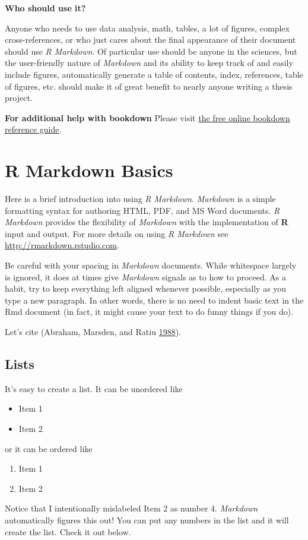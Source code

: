 \documentclass[msc,numbers]{coppe}
\providecommand{\tightlist}{%
  \setlength{\itemsep}{0pt}\setlength{\parskip}{0pt}}
\begin{document}
  \textbf{Who should use it?}
  
  Anyone who needs to use data analysis, math, tables, a lot of figures, complex cross-references, or who just cares about the final appearance of their document should use \emph{R Markdown}. Of particular use should be anyone in the sciences, but the user-friendly nature of \emph{Markdown} and its ability to keep track of and easily include figures, automatically generate a table of contents, index, references, table of figures, etc. should make it of great benefit to nearly anyone writing a thesis project.
  
  \textbf{For additional help with bookdown}
  Please visit \href{https://bookdown.org/yihui/bookdown/}{the free online bookdown reference guide}.
  
  \hypertarget{rmd-basics}{%
  \chapter{R Markdown Basics}\label{rmd-basics}}
  
  Here is a brief introduction into using \emph{R Markdown}. \emph{Markdown} is a simple formatting syntax for authoring HTML, PDF, and MS Word documents. \emph{R Markdown} provides the flexibility of \emph{Markdown} with the implementation of \textbf{R} input and output. For more details on using \emph{R Markdown} see \url{http://rmarkdown.rstudio.com}.
  
  Be careful with your spacing in \emph{Markdown} documents. While whitespace largely is ignored, it does at times give \emph{Markdown} signals as to how to proceed. As a habit, try to keep everything left aligned whenever possible, especially as you type a new paragraph. In other words, there is no need to indent basic text in the Rmd document (in fact, it might cause your text to do funny things if you do).
  
  Let's cite (Abraham, Marsden, and Ratiu \protect\hyperlink{ref-book-example}{1988}).
  
  \hypertarget{lists}{%
  \section{Lists}\label{lists}}
  
  It's easy to create a list. It can be unordered like
  \begin{itemize}
  \tightlist
  \item
    Item 1
  \item
    Item 2
  \end{itemize}
  or it can be ordered like
  \begin{enumerate}
  \def\labelenumi{\arabic{enumi}.}
  \tightlist
  \item
    Item 1
  \item
    Item 2
  \end{enumerate}
  Notice that I intentionally mislabeled Item 2 as number 4. \emph{Markdown} automatically figures this out! You can put any numbers in the list and it will create the list. Check it out below.
  
\end{document}
